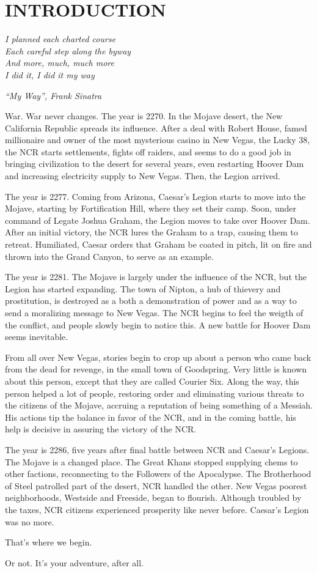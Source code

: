 \section{INTRODUCTION}

\epigraph{\textit{I planned each charted course \\
Each careful step along the byway \\
And more, much, much more \\
I did it, I did it my way}}{\textit{``My Way'', Frank Sinatra}}

War. War never changes. The year is 2270. In the Mojave desert, the New California Republic spreads its influence. After a deal with Robert House, famed millionaire and owner of the most mysterious casino in New Vegas, the Lucky 38, the NCR starts settlements, fights off raiders, and seems to do a good job in bringing civilization to the desert for several years, even restarting Hoover Dam and increasing electricity supply to New Vegas. Then, the Legion arrived.

The year is 2277. Coming from Arizona, Caesar's Legion starts to move into the Mojave, starting by Fortification Hill, where they set their camp. Soon, under command of Legate Joshua Graham, the Legion moves to take over Hoover Dam. After an initial victory, the NCR lures the Graham to a trap, causing them to retreat. Humiliated, Caesar orders that Graham be coated in pitch, lit on fire and thrown into the Grand Canyon, to serve as an example. 

The year is 2281. The Mojave is largely under the influence of the NCR, but the Legion has started expanding. The town of Nipton, a hub of thievery and prostitution, is destroyed as a both a demonstration of power and as a way to send a moralizing message to New Vegas. The NCR begins to feel the weigth of the conflict, and people slowly begin to notice this. A new battle for Hoover Dam seems inevitable. 

From all over New Vegas, stories begin to crop up about a person who came back from the dead for revenge, in the small town of Goodspring. Very little is known about this person, except that they are called Courier Six. Along the way, this person helped a lot of people, restoring order and eliminating various threats to the citizens of the Mojave, accruing a reputation of being something of a Messiah. His actions tip the balance in favor of the NCR, and in the coming battle, his help is decisive in assuring the victory of the NCR.

The year is 2286, five years after final battle between NCR and Caesar's Legions. The Mojave is a changed place. The Great Khans stopped supplying chems to other factions, reconnecting to the Followers of the Apocalypse. The Brotherhood of Steel patrolled part of the desert, NCR handled the other. New Vegas poorest neighborhoods, Westside and Freeside, began to flourish. Although troubled by the taxes, NCR citizens experienced prosperity like never before. Caesar's Legion was no more.

That's where we begin.

\newpage
Or not. It's your adventure, after all.